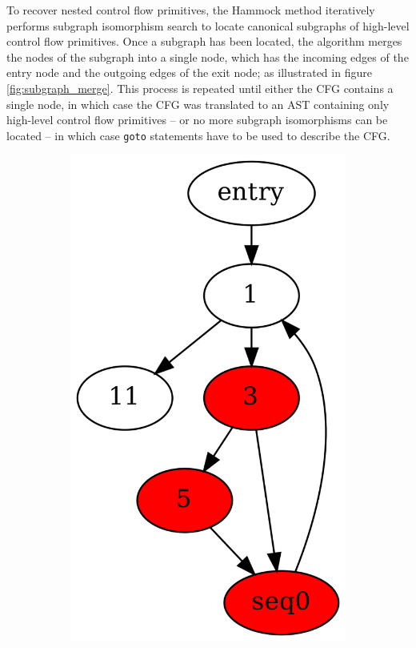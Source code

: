 
To recover nested control flow primitives, the Hammock method iteratively performs subgraph isomorphism search to locate canonical subgraphs of high-level control flow primitives. Once a subgraph has been located, the algorithm merges the nodes of the subgraph into a single node, which has the incoming edges of the entry node and the outgoing edges of the exit node; as illustrated in figure \ref{fig:subgraph_merge}. This process is repeated until either the CFG contains a single node, in which case the CFG was translated to an AST containing only high-level control flow primitives -- or no more subgraph isomorphisms can be located -- in which case \texttt{goto} statements have to be used to describe the CFG.

\begin{figure}[htbp]
	\centering
	\begin{subfigure}[ht]{0.17\textwidth}
		\includegraphics[width=\textwidth]{inc/3_background/cfg_pre_merge.png}

\end{subfigure}
\end{figure}
